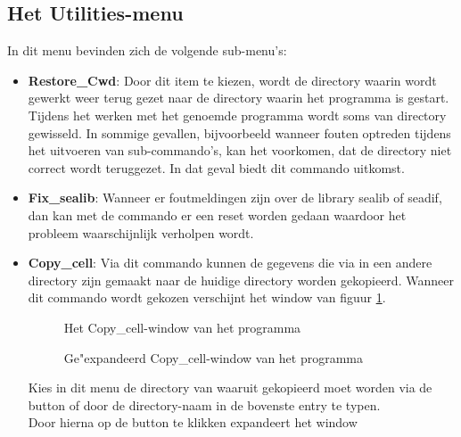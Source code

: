 \subsection{Het Utilities-menu}
In dit menu bevinden zich de volgende sub-menu's:
\begin{itemize}
\item {\bf Restore\_Cwd}: Door dit item te kiezen, wordt de directory waarin wordt
                    gewerkt weer terug gezet naar de directory waarin het
                    programma  is gestart. Tijdens het werken met
                    het genoemde programma wordt soms van directory gewisseld.
                    In sommige gevallen, bijvoorbeeld wanneer fouten
                    optreden tijdens het uitvoeren van sub-commando's,
                    kan het voorkomen, dat de directory niet correct wordt
                    teruggezet. In dat geval biedt dit commando uitkomst.
\item {\bf Fix\_sealib}: Wanneer er foutmeldingen zijn over de library sealib of seadif, dan kan
                    met de commando er een reset worden gedaan waardoor het probleem
                    waarschijnlijk verholpen wordt.
\item {\bf Copy\_cell}: Via dit commando kunnen de gegevens die via  in
                  een andere directory zijn gemaakt naar de huidige directory
                  worden gekopieerd.
                  Wanneer dit commando wordt gekozen verschijnt het window van
                  figuur \ref{copy-window}.
                  \begin{figure}[htb]
                  \centerline{}
                  \caption{Het Copy\_cell-window van het programma }
                  \label{copy-window}
                  \end{figure}
                  \begin{figure}[htb]
                  \centerline{}
                  \caption{Ge"expandeerd Copy\_cell-window van het programma }
                  \label{copy-window1}
                  \end{figure}
                  Kies in dit menu de directory van waaruit gekopieerd moet
                  worden via de  button of door de directory-naam in de
                  bovenste entry te typen.\\
                  Door hierna op de  button te klikken expandeert het window

\end{itemize}
